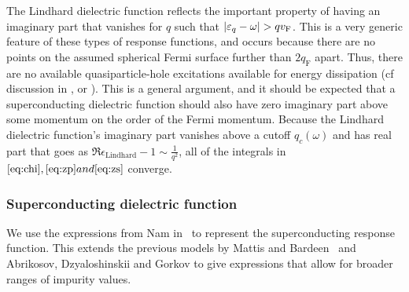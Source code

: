 \documentclass[%
 preprint,
 amsmath,amssymb,
 aps,
]{revtex4-2}
\newcommand{\vf}{v_{\mathrm{F}}}
\begin{document}
The Lindhard dielectric function reflects the important property of having an imaginary part that vanishes for $q$ such that $\abs{\varepsilon_q - \omega} >  q\vf$.
This is a very generic feature of these types of response functions, and occurs because there are no points on the assumed spherical Fermi surface further than $2 q_{\mathrm{F}}$ apart.
Thus, there are no available quasiparticle-hole excitations available for energy dissipation (cf discussion in \cite{AGD}, \cite{FetterWalecka} or \cite{SolyomV3}).
This is a general argument, and it should be expected that a superconducting dielectric function should also have zero imaginary part above some momentum on the order of the Fermi momentum.
Because the Lindhard dielectric function's imaginary part vanishes above a cutoff $q_c\left(\omega\right)$ and has real part that goes as $\Re \epsilon_{\mathrm{Lindhard}} - 1 \sim \frac{1}{q^2}$, all of the integrals in $\eqref{eq:chi}, \eqref{eq:zp} and \eqref{eq:zs}$ converge.

\subsubsection{Superconducting dielectric function} \label{subsubsec:namdielectric}

We use the expressions from Nam in~\cite{Nam1967} to represent the superconducting response function.
This extends the previous models by Mattis and Bardeen~\cite{Mattis} and Abrikosov, Dzyaloshinskii and Gorkov\cite{AGD} to give expressions that allow for broader ranges of impurity values.
\end{document}
